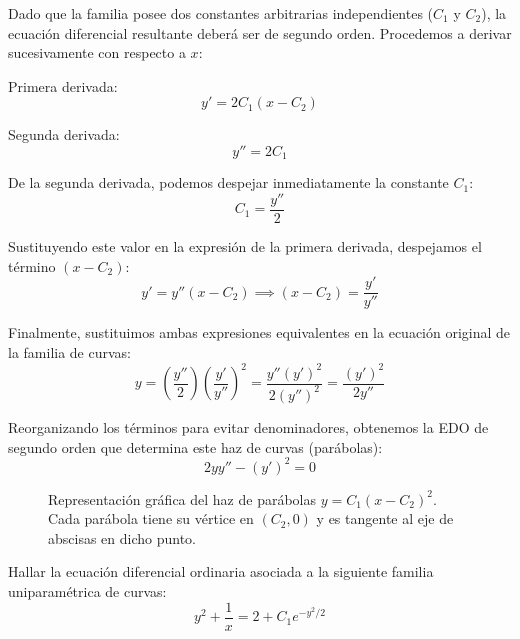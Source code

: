 \begin{tcolorbox}
Dado que la familia posee dos constantes arbitrarias independientes ($C_1$ y $C_2$), la ecuación diferencial resultante deberá ser de segundo orden. Procedemos a derivar sucesivamente con respecto a $x$:

Primera derivada:
$$ y' = 2C_1(x - C_2) $$

Segunda derivada:
$$ y'' = 2C_1 $$

De la segunda derivada, podemos despejar inmediatamente la constante $C_1$:
$$ C_1 = \frac{y''}{2} $$

Sustituyendo este valor en la expresión de la primera derivada, despejamos el término $(x - C_2)$:
$$ y' = y''(x - C_2) \implies (x - C_2) = \frac{y'}{y''} $$

Finalmente, sustituimos ambas expresiones equivalentes en la ecuación original de la familia de curvas:
$$ y = \left(\frac{y''}{2}\right) \left(\frac{y'}{y''}\right)^2 = \frac{y'' (y')^2}{2(y'')^2} = \frac{(y')^2}{2y''} $$

Reorganizando los términos para evitar denominadores, obtenemos la EDO de segundo orden que determina este haz de curvas (parábolas):
$$ 2yy'' - (y')^2 = 0 $$

\begin{figure}[H]
    \centering
    
    \caption{Representación gráfica del haz de parábolas
    $y=C_1(x-C_2)^2$. Cada parábola tiene su vértice en
    $(C_2,0)$ y es tangente al eje de abscisas en dicho punto.}
\end{figure}

\end{tcolorbox}
\vspace{0.5cm}

\begin{ejercicio}
Hallar la ecuación diferencial ordinaria asociada a la siguiente familia uniparamétrica de curvas:
$$ y^2 + \frac{1}{x} = 2 + C_1 e^{-y^2/2} $$
\end{ejercicio}

